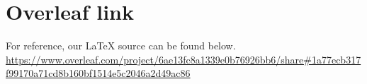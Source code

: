 \documentclass[11pt,sigconf,nonacm]{acmart}
\begin{document}
\section{Overleaf link}
For reference, our LaTeX source can be found below.
\newline
\textcolor{blue}{\url{https://www.overleaf.com/project/6ae13fc8a1339e0b76926bb6/share#1a77ecb317f99170a71cd8b160bf1514e5c2046a2d49ac86}}

\clearpage

\clearpage


\end{document}
